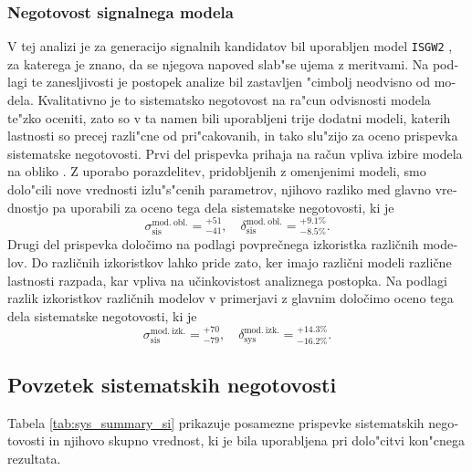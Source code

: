 \begin{otherlanguage}{slovene}
\subsubsection{Negotovost signalnega modela}
V tej analizi je za generacijo signalnih kandidatov bil uporabljen model \texttt{ISGW2} \cite{Scora:1995ty}, za katerega je znano, da se njegova napoved slab"se ujema z meritvami. Na podlagi te zanesljivosti je postopek analize bil zastavljen "cimbolj neodvisno od modela. Kvalitativno je to sistematsko negotovost na ra"cun odvisnosti modela te"zko oceniti, zato so v ta namen bili uporabljeni trije dodatni modeli, katerih lastnosti so precej razli"cne od pri"cakovanih, in tako slu"zijo za oceno prispevka sistematske negotovosti. Prvi del prispevka prihaja na račun vpliva izbire modela na obliko \varss. Z uporabo porazdelitev, pridobljenih z omenjenimi modeli, smo dolo"cili nove vrednosti izlu"s"cenih parametrov, njihovo razliko med glavno vrednostjo pa uporabili za oceno tega dela sistematske negotovosti, ki je
\begin{equation}
\sigma_{\mathrm{sis}}^{\mathrm{mod.~obl.}} = {}^{+51}_{-41},\quad \delta_{\mathrm{sis}}^{\mathrm{mod.~obl.}} = {}^{+9.1\%}_{-8.5\%}.
\end{equation}
Drugi del prispevka določimo na podlagi povprečnega izkoristka različnih modelov. Do različnih izkoristkov lahko pride zato, ker imajo različni modeli različne lastnosti razpada, kar vpliva na učinkovistost analiznega postopka. Na podlagi razlik izkoristkov različnih modelov v primerjavi z glavnim določimo oceno tega dela sistematske negotovosti, ki je
\begin{equation}
\sigma_{\mathrm{sis}}^{\mathrm{mod.~izk.}} = {}^{+70}_{-79},\quad \delta_{\mathrm{sys}}^{\mathrm{mod.~izk.}} = {}^{+14.3\%}_{-16.2\%}.
\end{equation}
\subsection{Povzetek sistematskih negotovosti}

Tabela \ref{tab:sys_summary_si} prikazuje posamezne prispevke sistematskih negotovosti in njihovo skupno vrednost, ki je bila uporabljena pri dolo"citvi kon"cnega rezultata.


\end{otherlanguage}
